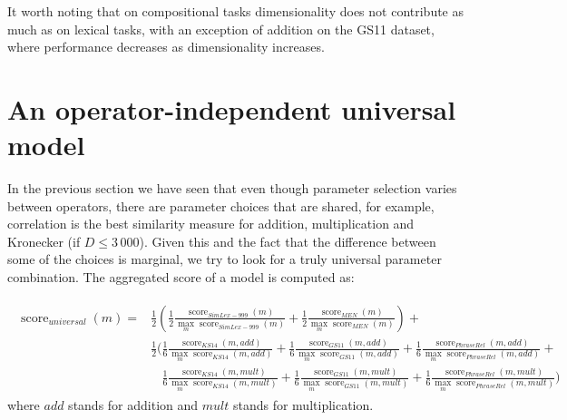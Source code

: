 It worth noting that on compositional tasks dimensionality does not contribute as much as on lexical tasks, with an exception of addition on the GS11 dataset, where performance decreases as dimensionality increases.

\section{An operator-independent universal model}
\label{sec:single}

In the previous section we have seen that even though parameter selection varies between operators, there are parameter choices that are shared, for example, correlation is the best similarity measure for addition, multiplication and Kronecker (if $D \le 3\,000$). Given this and the fact that the difference between some of the choices is marginal, we try to look for a truly universal parameter combination. The aggregated score of a model is computed as:

{\scriptsize
\begin{align}
  \begin{split}
\operatorname{score}_\mathit{universal}(\mathit{m}) = &%
\frac{1}{2}\left(
\frac{1}{2}%
\frac{\operatorname{score}_\mathit{SimLex-999}(\mathit{m})}%
{\max_m\operatorname{score}_\mathit{SimLex-999}(m)}%
+%
\frac{1}{2}%
\frac{\operatorname{score}_\mathit{MEN}(\mathit{m})}%
{\max_m\operatorname{score}_\mathit{MEN}(m)}%
\right)+
\\
&\frac{1}{2}\Bigg(
\frac{1}{6}%
\frac{\operatorname{score}_\mathit{KS14}(\mathit{m}, \mathit{add})}%
{\max_m\operatorname{score}_\mathit{KS14}(m, \mathit{add})}%
+%
\frac{1}{6}%
\frac{\operatorname{score}_\mathit{GS11}(\mathit{m}, \mathit{add})}%
{\max_m\operatorname{score}_\mathit{GS11}(m, \mathit{add})}%
+%
\frac{1}{6}%
\frac{\operatorname{score}_\mathit{PhraseRel}(\mathit{m, \mathit{add}})}%
{\max_m\operatorname{score}_\mathit{PhraseRel}(m, \mathit{add})}
+
\\
&\phantom{\frac{1}{2}\Bigg(}
\frac{1}{6}%
\frac{\operatorname{score}_\mathit{KS14}(\mathit{m}, \mathit{mult})}%
{\max_m\operatorname{score}_\mathit{KS14}(m, \mathit{mult})}%
+%
\frac{1}{6}%
\frac{\operatorname{score}_\mathit{GS11}(\mathit{m}, \mathit{mult})}%
{\max_m\operatorname{score}_\mathit{GS11}(m, \mathit{mult})}%
+%
\frac{1}{6}%
\frac{\operatorname{score}_\mathit{PhraseRel}(\mathit{m, \mathit{mult}})}%
{\max_m\operatorname{score}_\mathit{PhraseRel}(m, \mathit{mult})}
\Bigg)
\end{split}
\end{align}
\normalsize
}
where $\mathit{add}$ stands for addition and $\mathit{mult}$ stands for multiplication.
